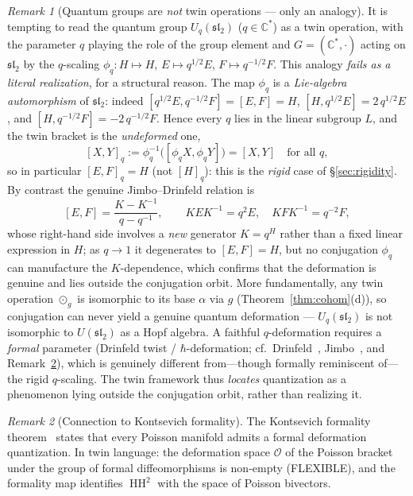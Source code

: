 \documentclass[11pt,twocolumn]{article}
\theoremstyle{plain}\newtheorem{theorem}{Theorem}\newtheorem{proposition}[theorem]{Proposition}\newtheorem{corollary}[theorem]{Corollary}\newtheorem{lemma}[theorem]{Lemma}
\theoremstyle{definition}\newtheorem{definition}[theorem]{Definition}\newtheorem{example}[theorem]{Example}
\theoremstyle{remark}\newtheorem{remark}[theorem]{Remark}
\newcommand{\HH}{\operatorname{HH}}
\begin{document}
\begin{remark}[Quantum groups are \emph{not} twin operations --- only an analogy]\label{rem:quantum}
It is tempting to read the quantum group $U_q(\mathfrak{sl}_2)$ ($q \in \mathbb{C}^*$) as a twin operation, with the parameter $q$ playing the role of the group element and $G = (\mathbb{C}^*, \cdot)$ acting on $\mathfrak{sl}_2$ by the $q$-scaling $\phi_q: H \mapsto H$, $E \mapsto q^{1/2}E$, $F \mapsto q^{-1/2}F$. This analogy \emph{fails as a literal realization}, for a structural reason. The map $\phi_q$ is a \emph{Lie-algebra automorphism} of $\mathfrak{sl}_2$: indeed $[q^{1/2}E, q^{-1/2}F] = [E,F] = H$, $[H, q^{1/2}E] = 2\,q^{1/2}E$, and $[H, q^{-1/2}F] = -2\,q^{-1/2}F$. Hence every $q$ lies in the linear subgroup $L$, and the twin bracket is the \emph{undeformed} one,
\[
[X,Y]_q := \phi_q^{-1}\big([\phi_q X, \phi_q Y]\big) = [X,Y] \quad \text{for all } q,
\]
so in particular $[E,F]_q = H$ (not $[H]_q$): this is the \emph{rigid} case of \S\ref{sec:rigidity}. By contrast the genuine Jimbo--Drinfeld relation is
\[
[E,F]=\frac{K-K^{-1}}{q-q^{-1}},\qquad KEK^{-1}=q^2E,\quad KFK^{-1}=q^{-2}F,
\]
whose right-hand side involves a \emph{new} generator $K=q^{H}$ rather than a fixed linear expression in $H$; as $q\to1$ it degenerates to $[E,F]=H$, but no conjugation $\phi_q$ can manufacture the $K$-dependence, which confirms that the deformation is genuine and lies outside the conjugation orbit. More fundamentally, any twin operation $\odot_g$ is isomorphic to its base $\alpha$ via $g$ (Theorem~\ref{thm:cohom}(d)), so conjugation can never yield a genuine quantum deformation --- $U_q(\mathfrak{sl}_2)$ is not isomorphic to $U(\mathfrak{sl}_2)$ as a Hopf algebra. A faithful $q$-deformation requires a \emph{formal} parameter (Drinfeld twist / $\hbar$-deformation; cf.\ Drinfeld~\cite{drinfeld1987}, Jimbo~\cite{jimbo1985}, and Remark~\ref{rem:kontsevich}), which is genuinely different from---though formally reminiscent of---the rigid $q$-scaling. The twin framework thus \emph{locates} quantization as a phenomenon lying outside the conjugation orbit, rather than realizing it.
\end{remark}

\begin{remark}[Connection to Kontsevich formality]\label{rem:kontsevich}
The Kontsevich formality theorem~\cite{kontsevich1997} states that every Poisson manifold admits a formal deformation quantization. In twin language: the deformation space $\mathcal{O}$ of the Poisson bracket under the group of formal diffeomorphisms is non-empty (FLEXIBLE), and the formality map identifies $\HH^2$ with the space of Poisson bivectors.
\end{remark}
\end{document}

